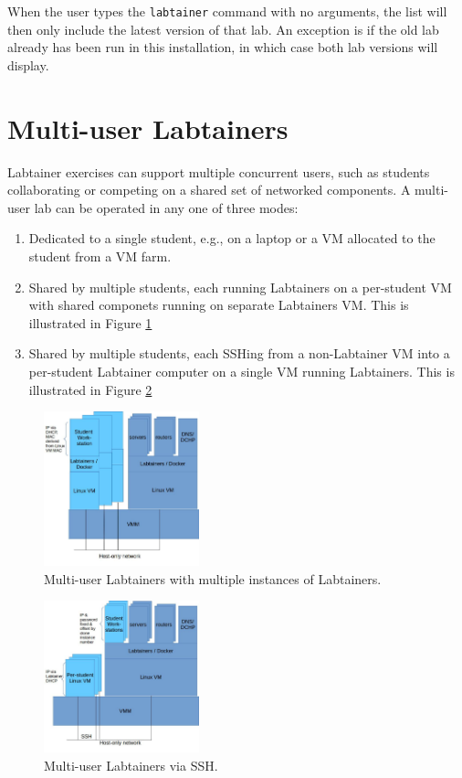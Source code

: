 \documentclass[12pt]{article}
\begin{document}
When the user types the {\tt labtainer} command with no arguments, the list will then
only include the latest version of that lab.  An exception is if the old lab already
has been run in this installation, in which case both lab versions will display.


\section {Multi-user Labtainers}
\label{multi user}
Labtainer exercises can support multiple concurrent users, such as students collaborating or competing on a shared 
set of networked components.  A multi-user lab can be operated in any one of three modes:
\begin{enumerate}
\item Dedicated to a single student, e.g., on a laptop or a VM allocated to the student from a VM farm.
\item Shared by multiple students, each running Labtainers on a per-student VM with shared componets running on separate
Labtainers VM.  This is illustrated in Figure \ref{fig:multi-multi}
\item Shared by multiple students, each SSHing from a non-Labtainer VM into a per-student Labtainer computer on a single
VM running Labtainers.  This is illustrated in Figure \ref{fig:multi-single}
\end{enumerate}

\begin{figure}[ht]
\centering
\includegraphics[width=0.4\textwidth,natwidth=621,natheight=403]{multiuser-multilabtainers.jpg}
\caption{Multi-user Labtainers with multiple instances of Labtainers.}
\label{fig:multi-multi}
\end{figure}

\begin{figure}[ht]
\centering
\includegraphics[width=0.4\textwidth,natwidth=621,natheight=403]{multiuser-onelabtainer.jpg}
\caption{Multi-user Labtainers via SSH.}
\label{fig:multi-single}
\end{figure}
\end{document}
